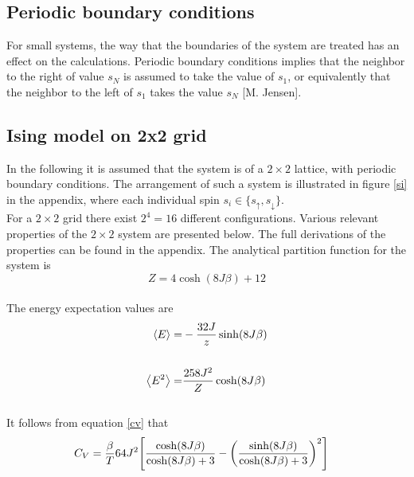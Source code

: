 \documentclass[%
reprint,nofootinbib,
amsmath,amssymb,
aps,
]{revtex4-1}
\begin{document}
\subsection*{Periodic boundary conditions} \noindent 
For small systems, the way that the boundaries of the system are treated has an effect on the calculations. Periodic boundary conditions implies that the neighbor to the right of value $s_N$ is assumed to take the value of $s_1$, or equivalently that the neighbor to the left of $s_1$ takes the value $s_N$ [M. Jensen]. 


\subsection*{Ising model on 2x2 grid} \noindent 
In the following it is assumed that the system is of a $2\times2$ lattice, with periodic boundary conditions. The arrangement of such a system is illustrated in figure \ref{si} in the appendix, where each individual spin $s_i \in \{s_\uparrow, s_\downarrow\}$. \\ \indent 
For a $2\times 2$ grid there exist $2^4 = 16$ different configurations. Various relevant properties of the $2\times 2$ system are presented below. The full derivations of the properties can be found in the appendix. The analytical partition function for the system is \\ 
\begin{equation} 
	Z =  4\cosh(8J\beta) + 12 
\end{equation} \\
The energy expectation values are \vspace{1mm} \\ 
\begin{align}\label{E}
	\expval{E} =& -\dfrac{32J}{z}\sinh(8J\beta) \\ &\nonumber\\
	\expval{E^2} =& \dfrac{258J^2}{Z}\cosh(8J\beta)
\end{align}\vspace{1mm} \\ 
It follows from equation \ref{cv} that \vspace{1mm} \\ 
\begin{align} \label{CV}
	C_V= \dfrac{\beta}{T}64J^2\qty[\dfrac{\cosh(8J\beta)}{\cosh(8J\beta) + 3}  -\qty(\dfrac{\sinh(8J\beta)}{\cosh(8J\beta) + 3 })^2]\nonumber  \\&\nonumber \\
\end{align}\vspace{1mm} \\ 
\end{document}
